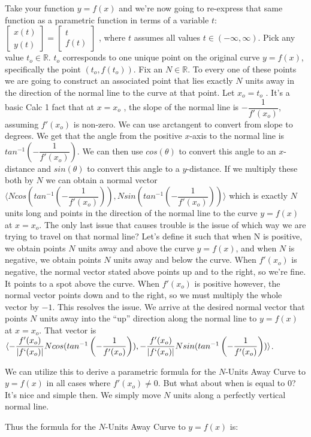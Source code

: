 Take your function $y=f(x)$ and we’re now going to re-express that same function as a parametric function in terms of a variable $t$: 
$
\begin{bmatrix}
    x(t) \\ y(t)
\end{bmatrix}
= 
\begin{bmatrix}
    t \\ f(t)
\end{bmatrix}
$
, where $t$ assumes all values $t \in (- \infty, \infty)$. Pick any value $t_o \in \mathbb{R}$. $t_o$ corresponds to one unique point on the original curve $y=f(x)$, specifically the point $(t_o , f(t_o ))$. Fix an $N \in \mathbb{R}$. To every one of these points we are going to construct an associated point that lies exactly $N$ units away in the direction of the normal line to the curve at that point. Let $x_o = t_o$ . It’s a basic Calc 1 fact that at $x = x_o$ , the slope of the normal line is $-\dfrac{1}{f'(x_o)}$, assuming $f'(x_o)$ is non-zero. We can use arctangent to convert from slope to degrees. We get that the angle from the positive $x$-axis to the normal line is $tan^{-1} \left( -\dfrac{1}{f'(x_o)} \right) $. We can then use $cos(\theta)$ to convert this angle to an $x$-distance and $sin(\theta)$ to convert this angle to a $y$-distance. If we multiply these both by $N$ we can obtain a normal vector $\langle N cos (tan^{-1} \left( -\dfrac{1}{f'(x_o)} \right) ), N sin ( tan^{-1} \left( -\dfrac{1}{f'(x_o)} \right) ) \rangle $ which is exactly $N$ units long and points in the direction of the normal line to the curve $y = f(x)$ at $x = x_o$. The only last issue that causes trouble is the issue of which way we are trying to travel on that normal line? Let’s define it such that when N is positive, we obtain points $N$ units away and above the curve $y = f(x)$, and when $N$ is negative, we obtain points $N$ units away and below the curve. When $f'(x_o)$ is negative, the normal vector stated above points up and to the right, so we’re fine. It points to a spot above the curve. When $f'(x_o)$ is positive however, the normal vector points down and to the right, so we must multiply the whole vector by $-1$. This resolves the issue. We arrive at the desired normal vector that points $N$ units away into the ``up'' direction along the normal line to $y = f(x)$ at $x = x_o$. That vector is $\langle - \dfrac{f'(x_o)}{|f`(x_o)|} N cos (tan^{-1} \left( -\dfrac{1}{f'(x_o)} \right) ), - \dfrac{f'(x_o)}{|f`(x_o)|} N sin (tan^{-1} \left( -\dfrac{1}{f'(x_o)} \right) ) \rangle$.

We can utilize this to derive a parametric formula for the $N$-Units Away Curve to $y=f(x)$
in all cases where $f'(x_o) \neq 0$. But what about when is equal to 0? It’s nice and simple then.
We simply move $N$ units along a perfectly vertical normal line.

Thus the formula for the $N$-Units Away Curve to $y=f(x)$ is:

\firstFormula
